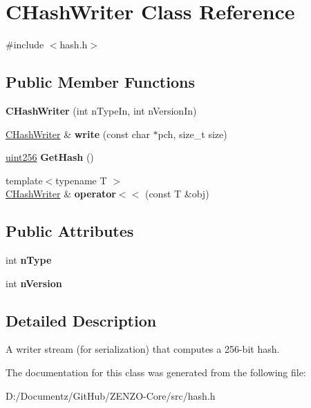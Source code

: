 \hypertarget{class_c_hash_writer}{}\section{C\+Hash\+Writer Class Reference}
\label{class_c_hash_writer}


{\ttfamily \#include $<$hash.\+h$>$}

\subsection*{Public Member Functions}
\begin{DoxyCompactItemize}
\item 
\mbox{\label{class_c_hash_writer_a81ce9a497a72fcb6b2612efdc20efbc9}} 
{\bfseries C\+Hash\+Writer} (int n\+Type\+In, int n\+Version\+In)
\item 
\mbox{\label{class_c_hash_writer_a779360281eeeb4cc7485c8acae649bc9}} 
\mbox{\hyperlink{class_c_hash_writer}{C\+Hash\+Writer}} \& {\bfseries write} (const char $\ast$pch, size\+\_\+t size)
\item 
\mbox{\label{class_c_hash_writer_ae94a937211502eabf19477630090093a}} 
\mbox{\hyperlink{classuint256}{uint256}} {\bfseries Get\+Hash} ()
\item 
\mbox{\label{class_c_hash_writer_a6551aed7315be5ba750680df18562f3a}} 
{\footnotesize template$<$typename T $>$ }\\\mbox{\hyperlink{class_c_hash_writer}{C\+Hash\+Writer}} \& {\bfseries operator$<$$<$} (const T \&obj)
\end{DoxyCompactItemize}
\subsection*{Public Attributes}
\begin{DoxyCompactItemize}
\item 
\mbox{\label{class_c_hash_writer_ae8fe02b05db26a2647a7aeee035f022f}} 
int {\bfseries n\+Type}
\item 
\mbox{\label{class_c_hash_writer_ad7d3642addab58385476dc0f9d55fa58}} 
int {\bfseries n\+Version}
\end{DoxyCompactItemize}


\subsection{Detailed Description}
A writer stream (for serialization) that computes a 256-\/bit hash. 

The documentation for this class was generated from the following file\+:\begin{DoxyCompactItemize}
\item 
D\+:/\+Documentz/\+Git\+Hub/\+Z\+E\+N\+Z\+O-\/\+Core/src/hash.\+h\end{DoxyCompactItemize}
